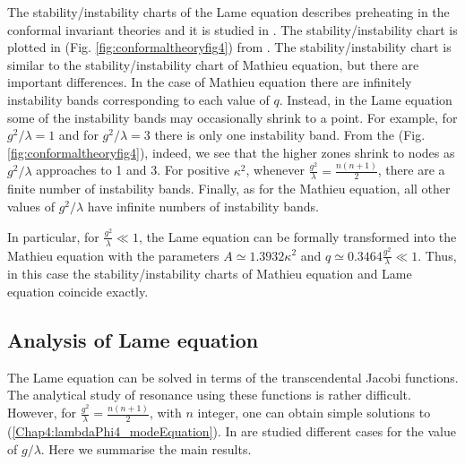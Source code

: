 \documentclass[11pt,a4paper,twoside]{book}
\begin{document}
The stability/instability charts of the Lame equation describes preheating in the conformal invariant theories and it is studied in \cite{Chap4:ModelLambdaPhi4Reference}.
The stability/instability chart is plotted in (Fig. \ref{fig:conformaltheoryfig4}) from \cite{Chap4:ModelLambdaPhi4Reference}. The stability/instability chart is similar to the stability/instability chart of Mathieu equation, but there are important differences. In the case of Mathieu equation there are infinitely instability bands corresponding to each value of $ q $. Instead, in the Lame equation some of the instability bands may occasionally shrink to a point. For example, for $ g^{2}/\lambda=1 $ and for $ g^{2}/\lambda=3 $ there is only one instability band. From the (Fig. \ref{fig:conformaltheoryfig4}), indeed, we see that the higher zones shrink to nodes as $ g^{2}/\lambda  $ approaches to 1 and 3. For positive $\kappa^{2}$, whenever $ \frac{g^{2}}{\lambda}=\frac{n(n+1)}{2} $, there are a finite number of instability bands. Finally, as for the Mathieu equation, all other values of $ g^{2}/\lambda $ have infinite numbers of instability bands. 

In particular, for $\frac{g^{2}}{\lambda} \ll 1  $, the Lame equation can be formally transformed into the Mathieu equation with the parameters $ A\simeq 1.3932 \kappa^{2} $ and $ q\simeq 0.3464 \frac{g^{2}}{\lambda} \ll 1 $. Thus, in this case the stability/instability charts of Mathieu equation and Lame equation coincide exactly.
\subsection{Analysis of Lame equation}
The Lame equation can be solved in terms of the transcendental Jacobi functions. The analytical study of resonance using these functions is rather difficult. However, for $\frac{g^{2}}{\lambda}=\frac{n(n+1)}{2}  $, with $ n  $ integer, one can obtain simple solutions to (\ref{Chap4:lambdaPhi4_modeEquation}). In \cite{Chap4:ModelLambdaPhi4Reference} are studied different cases for the value of $ g/\lambda $. Here we summarise the main results.
\end{document}
